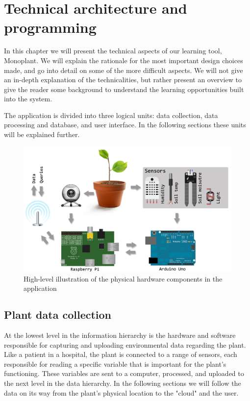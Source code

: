 \chapter{Technical architecture and programming}
In this chapter we will present the technical aspects of our learning tool, Monoplant. We will explain the rationale for the most important design choices made, and go into detail on some of the more difficult aspects. We will not give an in-depth explanation of the technicalities, but rather present an overview to give the reader some background to understand the learning opportunities built into the system. 

The application is divided into three logical units: data collection, data processing and database, and user interface. In the following sections these units will be explained further. 



\begin{figure}
\centering
\includegraphics[width=1\textwidth]{img/hardware/application.png}
\caption{High-level illustration of the physical hardware components in the application}
\label{fig:application}
\end{figure}

\section{Plant data collection}
At the lowest level in the information hierarchy is the hardware and software responsible for capturing and uploading environmental data regarding the plant. Like a patient in a hospital, the plant is connected to a range of sensors, each responsible for reading a specific variable that is important for the plant's functioning. These variables are sent to a computer, processed, and uploaded to the next level in the data hierarchy. In the following sections we will follow the data on its way from the plant's physical location to the "cloud" and the user.

